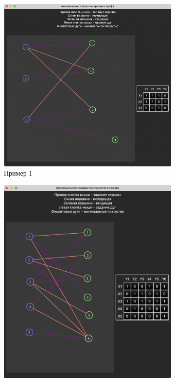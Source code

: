 \documentclass[12pt]{article}
\begin{document}
\begin{figure}[H]
    \begin{subfigure}{0.3\textwidth}
        \includegraphics[width=1\textwidth]{screenshot2.png}
        \caption{Пример 1}
        \label{fig:success_example_1}
    \end{subfigure}
    \begin{subfigure}{0.3\textwidth}
        \includegraphics[width=1\textwidth]{screenshot3.png}

\end{subfigure}
\end{figure}
\end{document}
